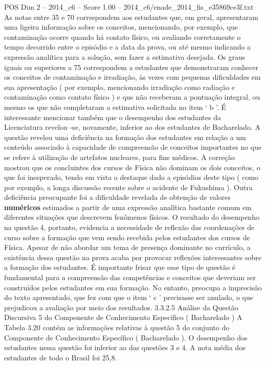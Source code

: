 \begin{textsample}{POS Dim 2 – 2014\_c6 – Score 1.00 – 2014\_c6/enade\_2014\_fis\_e35869ce3f.txt}
As notas entre 35 e 70 correspondem aos estudantes que, em geral, apresentaram uma ligeira informação sobre os conceitos, mencionando, por exemplo, que contaminação ocorre quando há contato físico, ou avaliando corretamente o tempo decorrido entre o episódio e a data da prova, ou até mesmo indicando a expressão analítica para a solução, sem fazer a estimativa desejada.
Os graus iguais ou superiores a 75 correspondem a estudantes que demonstraram conhecer os conceitos de contaminação e irradiação, às vezes com pequenas dificuldades em sua apresentação ( por exemplo, mencionando irradiação como radiação e contaminação como contato físico ) e que não receberam a pontuação integral, ou mesmo os que não completaram a estimativa solicitada no item ‘ b ’.
É interessante mencionar também que o desempenho dos estudantes da Licenciatura revelou -se, novamente, inferior ao dos estudantes de Bacharelado.
A questão revelou uma deficiência na formação dos estudantes em relação a um conteúdo associado à capacidade de compreensão de conceitos importantes no que se refere à utilização de artefatos nucleares, para fins médicos.
A correção mostrou que os concluintes dos cursos de Física não dominam os dois conceitos, o que foi inesperado, tendo em vista o destaque dado a episódios deste tipo ( como por exemplo, a longa discussão recente sobre o acidente de Fukushima ).
Outra deficiência preocupante foi a dificuldade revelada de obtenção de valores \textbf{numéricos} estimados a partir de uma expressão analítica bastante comum em diferentes situações que descrevem fenômenos físicos.
O resultado do desempenho na questão 4, portanto, evidencia a necessidade de reflexão das coordenações de curso sobre a formação que vem sendo recebida pelos estudantes dos cursos de Física.
Apesar de não abordar um tema de presença dominante no currículo, a existência dessa questão na prova acaba por provocar reflexões interessantes sobre a formação dos estudantes.
É importante frisar que esse tipo de questão é fundamental para a compreensão das competências e conceitos que deveriam ser construídos pelos estudantes em sua formação.
No entanto, preocupa a imprecisão do texto apresentado, que fez com que o item ‘ c ’ precisasse ser anulado, o que prejudicou a avaliação por meio dos resultados. 3.3.2.5 Análise da Questão Discursiva 5 do Componente de Conhecimento Específico ( Bacharelado ) A Tabela 3.20 contém as informações relativas à questão 5 do conjunto do Componente de Conhecimento Específico ( Bacharelado ).
O desempenho dos estudantes nessa questão foi inferior ao das questões 3 e 4.
A nota média dos estudantes de todo o Brasil foi 25,8.

\end{textsample}
